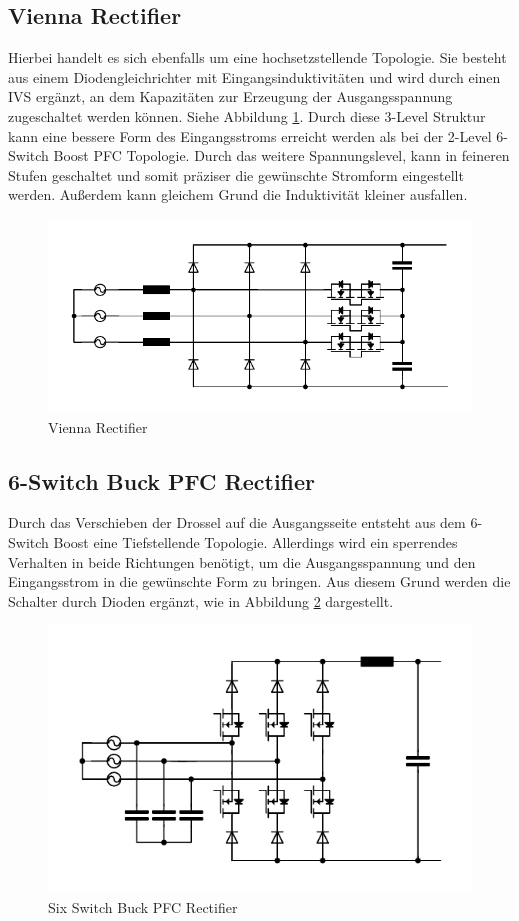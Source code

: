 	\subsection{Vienna Rectifier}
		Hierbei handelt es sich ebenfalls um eine hochsetzstellende Topologie. Sie besteht aus einem Diodengleichrichter mit Eingangsinduktivitäten und wird durch einen \gls{IVS} ergänzt, an dem Kapazitäten zur Erzeugung der Ausgangsspannung zugeschaltet werden können. Siehe Abbildung \ref{fig:vienna}. Durch diese 3-Level Struktur kann eine bessere Form des Eingangsstroms erreicht werden als bei der 2-Level 6-Switch Boost PFC Topologie. Durch das weitere Spannungslevel, kann in feineren Stufen geschaltet und somit präziser die gewünschte Stromform eingestellt werden. Außerdem kann gleichem Grund die Induktivität kleiner ausfallen.
		\begin{figure}[H]
			\centering
			\includegraphics[width=0.9\linewidth]{content/Grafiken/Vienna}
			\caption{Vienna Rectifier}
			\label{fig:vienna}
		\end{figure}
		
	\subsection{6-Switch Buck PFC Rectifier}
		\label{sec:6switchBuck}
		Durch das Verschieben der Drossel auf die Ausgangsseite entsteht aus dem 6-Switch Boost eine Tiefstellende Topologie. Allerdings wird ein sperrendes Verhalten in beide Richtungen benötigt, um die Ausgangsspannung und den Eingangsstrom in die gewünschte Form zu bringen. Aus diesem Grund werden die Schalter durch Dioden ergänzt, wie in Abbildung \ref{fig:sixswitchbuck} dargestellt.  
		
		\begin{figure}[H]
			\centering
			\includegraphics[width=0.9\linewidth]{content/Grafiken/SixSwitchBuck}
			\caption{Six Switch Buck PFC Rectifier}
			\label{fig:sixswitchbuck}
		\end{figure}
	
